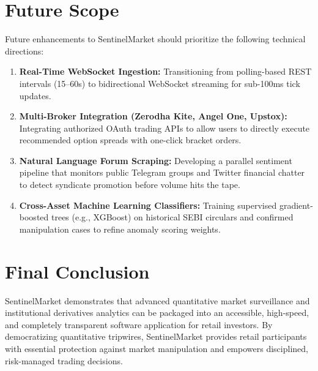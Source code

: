 \section{Future Scope}
Future enhancements to SentinelMarket should prioritize the following technical directions:
\begin{enumerate}
    \item \textbf{Real-Time WebSocket Ingestion:} Transitioning from polling-based REST intervals (15--60s) to bidirectional WebSocket streaming for sub-100ms tick updates.
    \item \textbf{Multi-Broker Integration (Zerodha Kite, Angel One, Upstox):} Integrating authorized OAuth trading APIs to allow users to directly execute recommended option spreads with one-click bracket orders.
    \item \textbf{Natural Language Forum Scraping:} Developing a parallel sentiment pipeline that monitors public Telegram groups and Twitter financial chatter to detect syndicate promotion before volume hits the tape.
    \item \textbf{Cross-Asset Machine Learning Classifiers:} Training supervised gradient-boosted trees (e.g., XGBoost) on historical SEBI circulars and confirmed manipulation cases to refine anomaly scoring weights.
\end{enumerate}

\section{Final Conclusion}
SentinelMarket demonstrates that advanced quantitative market surveillance and institutional derivatives analytics can be packaged into an accessible, high-speed, and completely transparent software application for retail investors. By democratizing quantitative tripwires, SentinelMarket provides retail participants with essential protection against market manipulation and empowers disciplined, risk-managed trading decisions.
